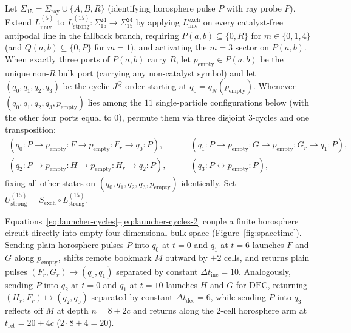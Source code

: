 \begin{definition}
\label{def:u-strong15}
Let $\Sigma_{15} = \Sigma_{\mathrm{ray}} \cup \{A, B, R\}$ (identifying horosphere pulse $P$ with ray probe $P$). Extend $L_{\mathrm{univ}}^{(5)}$ to $L_{\mathrm{strong}}^{(15)} : \Sigma_{15}^{24} \to \Sigma_{15}^{24}$ by applying $L_{\mathrm{line}}^{\mathrm{exch}}$ on every catalyst-free antipodal line in the fallback branch, requiring $P(a,b) \subseteq \{0, R\}$ for $m \in \{0, 1, 4\}$ (and $Q(a,b) \subseteq \{0, P\}$ for $m = 1$), and activating the $m = 3$ sector on $P(a,b)$. When exactly three ports of $P(a,b)$ carry $R$, let $p_{\mathrm{empty}} \in P(a,b)$ be the unique non-$R$ bulk port (carrying any non-catalyst symbol) and let $(q_0, q_1, q_2, q_3)$ be the cyclic $J^Q$-order starting at $q_0 = q_N(p_{\mathrm{empty}})$. Whenever $(q_0, q_1, q_2, q_3, p_{\mathrm{empty}})$ lies among the $11$ single-particle configurations below (with the other four ports equal to $0$), permute them via three disjoint $3$-cycles and one transposition:
\begin{align}
(q_0{:}P \to p_{\mathrm{empty}}{:}F \to p_{\mathrm{empty}}{:}F_r \to q_0{:}P), &\qquad
(q_1{:}P \to p_{\mathrm{empty}}{:}G \to p_{\mathrm{empty}}{:}G_r \to q_1{:}P), \label{eq:launcher-cycles}\\
(q_2{:}P \to p_{\mathrm{empty}}{:}H \to p_{\mathrm{empty}}{:}H_r \to q_2{:}P), &\qquad
(q_3{:}P \leftrightarrow p_{\mathrm{empty}}{:}P), \label{eq:launcher-cycles-2}
\end{align}
fixing all other states on $(q_0, q_1, q_2, q_3, p_{\mathrm{empty}})$ identically. Set $U_{\mathrm{strong}}^{(15)} = S_{\mathrm{exch}} \circ L_{\mathrm{strong}}^{(15)}$.
\end{definition}

Equations~\eqref{eq:launcher-cycles}--\eqref{eq:launcher-cycles-2} couple a finite horosphere circuit directly into empty four-dimensional bulk space (Figure~\ref{fig:spacetime}). Sending plain horosphere pulses $P$ into $q_0$ at $t=0$ and $q_1$ at $t=6$ launches $F$ and $G$ along $p_{\mathrm{empty}}$, shifts remote bookmark $M$ outward by $+2$ cells, and returns plain pulses $(F_r, G_r) \mapsto (q_0, q_1)$ separated by constant $\Delta t_{\mathrm{inc}} = 10$. Analogously, sending $P$ into $q_2$ at $t=0$ and $q_1$ at $t=10$ launches $H$ and $G$ for $\mathrm{DEC}$, returning $(H_r, F_r) \mapsto (q_2, q_0)$ separated by constant $\Delta t_{\mathrm{dec}} = 6$, while sending $P$ into $q_3$ reflects off $M$ at depth $n = 8 + 2c$ and returns along the $2$-cell horosphere arm at $t_{\mathrm{ret}} = 20 + 4c$ ($2 \cdot 8 + 4 = 20$).

